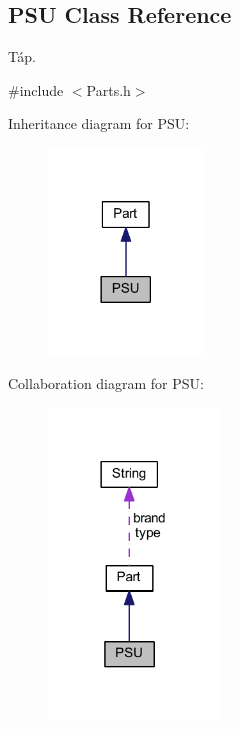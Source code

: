 \hypertarget{class_p_s_u}{}\subsection{P\+SU Class Reference}
\label{class_p_s_u}


Táp.  




{\ttfamily \#include $<$Parts.\+h$>$}



Inheritance diagram for P\+SU\+:
\nopagebreak
\begin{figure}[H]
\begin{center}
\leavevmode
\includegraphics[width=117pt]{class_p_s_u__inherit__graph}
\end{center}
\end{figure}


Collaboration diagram for P\+SU\+:
\nopagebreak
\begin{figure}[H]
\begin{center}
\leavevmode
\includegraphics[width=129pt]{class_p_s_u__coll__graph}
\end{center}
\end{figure}
